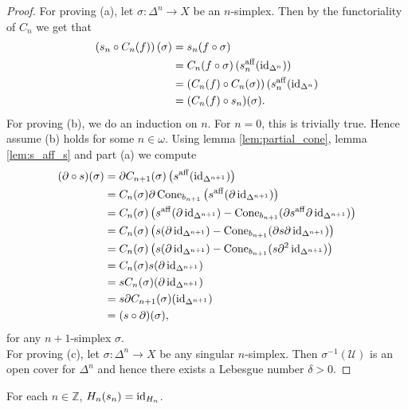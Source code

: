 \begin{proof}
	For proving (a), let $\sigma : \Delta^n \to X$ be an $n$-simplex. Then by the functoriality of $C_n$ we get that
	\begin{align*}
		\del[0]{s_n \circ C_n(f)}(\sigma) &= s_n(f \circ \sigma)\\
		&= C_n(f \circ \sigma)\del[0]{s_n^{\mathrm{aff}}(\id_{\Delta^n})}\\ 
		&= \del[0]{C_n(f) \circ C_n(\sigma)}(s^{\mathrm{aff}}_n(\id_{\Delta^n})\\ 
		&= (C_n(f) \circ s_n)(\sigma).
	\end{align*}
	For proving (b), we do an induction on $n$. For $n = 0$, this is trivially true. Hence assume (b) holds for some $n \in \omega$. Using lemma \ref{lem:partial_cone}, lemma \ref{lem:s_aff_s} and part (a) we compute
	\begin{align*}
		(\partial \circ s)(\sigma) &= \partial C_{n + 1}(\sigma) \del[1]{s^{\mathrm{aff}}(\id_{\Delta^{n+1}})}\\
		&= C_n(\sigma)\partial\Cone_{b_{n + 1}}\del[1]{s^{\mathrm{aff}}(\partial\id_{\Delta^{n+1}})}\\
		&= C_n(\sigma)\del[1]{s^{\mathrm{aff}}(\partial\id_{\Delta^{n+1}}) - \Cone_{b_{n + 1}}(\partial s^{\mathrm{aff}}\partial\id_{\Delta^{n+1}})}\\
		&= C_n(\sigma)\del[1]{s(\partial\id_{\Delta^{n+1}}) - \Cone_{b_{n + 1}}(\partial s\partial\id_{\Delta^{n+1}})}\\
		&= C_n(\sigma)\del[1]{s(\partial\id_{\Delta^{n+1}}) - \Cone_{b_{n + 1}}(s\partial^2\id_{\Delta^{n+1}})}\\
		&= C_n(\sigma)s(\partial\id_{\Delta^{n+1}})\\
		&= sC_n(\sigma)(\partial\id_{\Delta^{n+1}})\\
		&= s \partial C_{n + 1}(\sigma)(\id_{\Delta^{n + 1}})\\
		&= (s \circ \partial)(\sigma),
	\end{align*}
	\noindent for any $n + 1$-simplex $\sigma$.\\
	For proving (c), let $\sigma : \Delta^n \to X$ be any singular $n$-simplex. Then $\sigma^{-1}(\mathcal{U})$ is an open cover for $\Delta^n$ and hence there exists a Lebesgue number $\delta > 0$. 
\end{proof}

\begin{theorem}
	For each $n \in \mathbb{Z}$, $H_n(s_n) = \operatorname{id}_{H_n}$.
\end{theorem}


